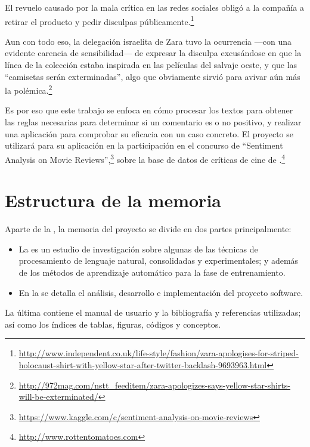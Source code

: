 \begin{example}
El revuelo causado por la mala crítica en las redes sociales obligó a la compañía a retirar el producto y pedir disculpas públicamente.\footnote{\url{http://www.independent.co.uk/life-style/fashion/zara-apologises-for-striped-holocaust-shirt-with-yellow-star-after-twitter-backlash-9693963.html}}

Aun con todo eso, la delegación israelita de Zara tuvo la ocurrencia ---con una evidente carencia de sensibilidad--- de expresar la disculpa excusándose en que la línea de la colección estaba inspirada en las películas del salvaje oeste, y que las ``camisetas serán exterminadas'', algo que obviamente sirvió para avivar aún más la polémica.\footnote{\url{http://972mag.com/nstt_feeditem/zara-apologizes-says-yellow-star-shirts-will-be-exterminated/}}
\end{example}

Es por eso que este trabajo se enfoca en cómo procesar los textos para obtener las reglas necesarias para determinar si un comentario es o no positivo, y realizar una aplicación para comprobar su eficacia con un caso concreto. El proyecto se utilizará para su aplicación en la participación en el concurso de  ``Sentiment Analysis on Movie Reviews'',\footnote{\url{https://www.kaggle.com/c/sentiment-analysis-on-movie-reviews}} sobre la base de datos de críticas de cine de .\footnote{\url{http://www.rottentomatoes.com}}

\section{Estructura de la memoria}

Aparte de la , la memoria del proyecto se divide en dos partes principalmente:
\begin{itemize}
\item La  es un estudio de investigación sobre algunas de las técnicas de procesamiento de lenguaje natural, consolidadas y experimentales; y además de los métodos de aprendizaje automático para la fase de entrenamiento.
\item En la  se detalla el análisis, desarrollo e implementación del proyecto software.
\end{itemize}

La última  contiene el manual de usuario y la bibliografía y referencias utilizadas; así como los índices de tablas, figuras, códigos y conceptos.
